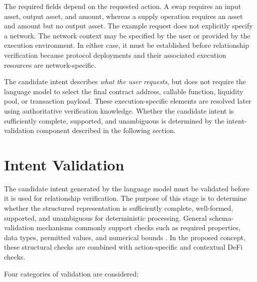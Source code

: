 The required fields depend on the requested action. A swap requires an input
asset, output asset, and amount, whereas a supply operation requires an asset
and amount but no output asset. The example request does not explicitly
specify a network. The network context may be specified by the user or
provided by the execution environment. In either case, it must be established
before relationship verification because protocol deployments and their
associated execution resources are network-specific.

The candidate intent describes \textit{what the user requests}, but does not
require the language model to select the final contract address, callable
function, liquidity pool, or transaction payload. These execution-specific
elements are resolved later using authoritative verification knowledge.
Whether the candidate intent is sufficiently complete, supported, and
unambiguous is determined by the intent-validation component described in
the following section.


\section{Intent Validation}
\label{sec:intent_validation}

The candidate intent generated by the language model must be validated before
it is used for relationship verification. The purpose of this stage is to
determine whether the structured representation is sufficiently complete,
well-formed, supported, and unambiguous for deterministic processing. General schema-validation mechanisms commonly support checks such as required
properties, data types, permitted values, and numerical bounds
\cite{jsonschema2020}. In the proposed concept, these structural checks are
combined with action-specific and contextual DeFi checks.

Four categories of validation are considered:

